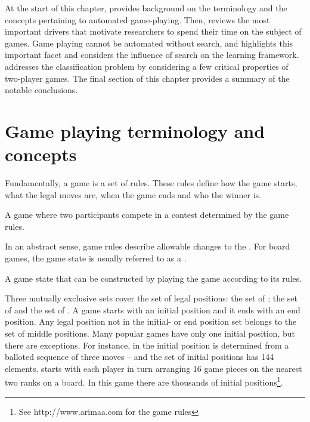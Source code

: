 At the start of this chapter,  provides background on the terminology and the concepts pertaining to automated game-playing. Then,   reviews the most important drivers that motivate researchers to spend their time on the subject of games. Game playing cannot be automated without search, and  highlights this important facet and considers the influence of search on the learning framework.  addresses the classification problem by considering a few critical properties of two-player games.  The final section of this chapter provides a summary of the notable conclusions.  

\section{Game playing terminology and concepts}
\label{sec:concepts-and-terms}

Fundamentally, a game is a set of rules.  These rules define how the game starts, what the legal moves are,  when the game ends and who the winner is.  

 {A game where two participants compete in a contest determined by the game rules.} 

In an abstract sense,  game rules describe allowable changes to the .  For board games, the game state is usually referred to as a . 

 {A game state that can be constructed by playing the game according to its rules.}

Three mutually exclusive sets cover the set of legal positions: the set of ; the set of  and the set of .  A game starts with an initial position and it ends with an end position.  Any legal position not in the initial- or end position set belongs to the set of middle positions. Many popular games have only one initial position, but there are exceptions.  For instance, in   the initial position is determined from a balloted sequence of three moves \cite{schaeffer:solving} -- and the set of  initial positions has 144 elements.  starts with each player in turn arranging 16 game pieces on the nearest two ranks on a  board.  In this game there are thousands of initial positions\footnote{See http://www.arimaa.com for the  game rules}. 

